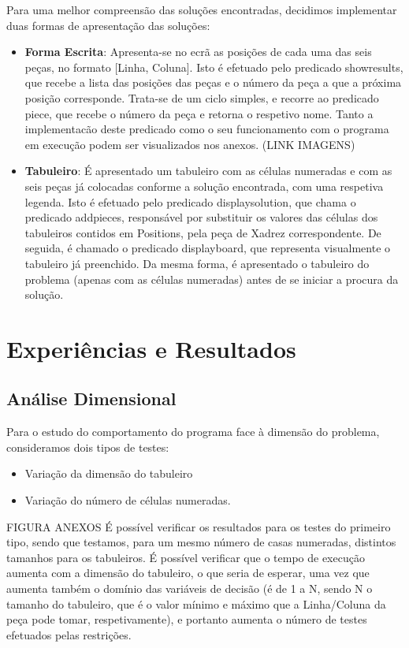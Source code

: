 \documentclass[runningheads]{llncs}
\begin{document}
Para uma melhor compreensão das soluções encontradas, decidimos implementar duas formas de apresentação das soluções:
\begin{itemize}
    \item \textbf{Forma Escrita}:
    Apresenta-se no ecrã as posições de cada uma das seis peças, no formato [Linha, Coluna].
    Isto é efetuado pelo predicado show\textunderscore results, que recebe a lista das posições das peças e o número da peça a que a próxima posição corresponde. Trata-se de um ciclo simples, e recorre ao predicado piece, que recebe o número da peça e retorna o respetivo nome.
    Tanto a implementacão deste predicado como o seu funcionamento com o programa em execução podem ser visualizados nos anexos. (LINK IMAGENS)
    \item \textbf{Tabuleiro}:
    É apresentado um tabuleiro com as células numeradas e com as seis peças já colocadas conforme a solução encontrada, com uma respetiva legenda.
    Isto é efetuado pelo predicado display\textunderscore solution, que chama o predicado add\textunderscore pieces, responsável por substituir os valores das células dos tabuleiros contidos em Positions, pela peça de Xadrez correspondente. De seguida, é chamado o predicado display\textunderscore board, que representa visualmente o tabuleiro já preenchido.
    Da mesma forma, é apresentado o tabuleiro do problema (apenas com as células numeradas) antes de se iniciar a procura da solução.
\end{itemize}

\newpage
\section{Experiências e Resultados}
\subsection{Análise Dimensional}
Para o estudo do comportamento do programa face à dimensão do problema, consideramos dois tipos de testes: 
\begin{itemize}
    \item Variação da dimensão do tabuleiro
    \item Variação do número de células numeradas.
\end{itemize}

FIGURA ANEXOS
É possível verificar os resultados para os testes do primeiro tipo, sendo que testamos, para um mesmo número de casas numeradas, distintos tamanhos para os tabuleiros.
É possível verificar que o tempo de execução aumenta com a dimensão do tabuleiro, o que seria de esperar, uma vez que aumenta também o domínio das variáveis de decisão (é de 1 a N, sendo N o tamanho do tabuleiro, que é o valor mínimo e máximo que a Linha/Coluna da peça pode tomar, respetivamente), e portanto aumenta o número de testes efetuados pelas restrições.
\end{document}
